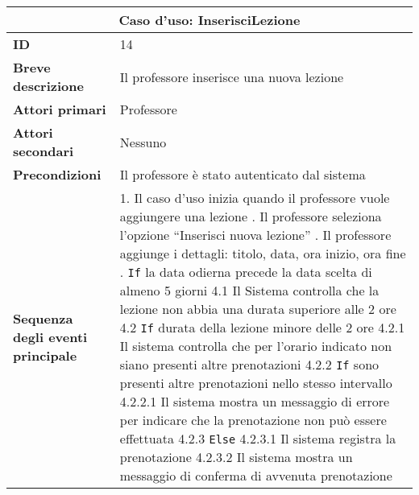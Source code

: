 \documentclass[11pt,a4paper]{report}
\begin{document}
\begin{table}[h!]
\centering
\renewcommand{\arraystretch}{1.3}
\begin{tabular}{|p{4.2cm}|p{10.2cm}|}
\hline
\multicolumn{2}{|c|}{\textbf{Caso d’uso: InserisciLezione}} \\ \hline
\textbf{ID} & 14 \\ \hline
\textbf{Breve descrizione} & Il professore inserisce una nuova lezione \\ \hline
\textbf{Attori primari} & Professore \\ \hline
\textbf{Attori secondari} & Nessuno \\ \hline
\textbf{Precondizioni} & Il professore è stato autenticato dal sistema \\ \hline
\textbf{Sequenza degli eventi principale} &
1. Il caso d’uso inizia quando il professore vuole aggiungere una lezione \newline
2. Il professore seleziona l’opzione “Inserisci nuova lezione” \newline
3. Il professore aggiunge i dettagli: titolo, data, ora inizio, ora fine \newline
4. \texttt{If} la data odierna precede la data scelta di almeno 5 giorni \newline
\hspace*{0.5cm} 4.1 Il Sistema controlla che la lezione non abbia una durata superiore alle 2 ore \newline
\hspace*{0.5cm} 4.2 \texttt{If} durata della lezione minore delle 2 ore \newline
\hspace*{1cm} 4.2.1 Il sistema controlla che per l’orario indicato non siano presenti altre prenotazioni \newline
\hspace*{1cm} 4.2.2 \texttt{If} sono presenti altre prenotazioni nello stesso intervallo \newline
\hspace*{1.5cm} 4.2.2.1 Il sistema mostra un messaggio di errore per indicare che la prenotazione non può essere effettuata \newline
\hspace*{1cm} 4.2.3 \texttt{Else} \newline
\hspace*{1.5cm} 4.2.3.1 Il sistema registra la prenotazione \newline
\hspace*{1.5cm} 4.2.3.2 Il sistema mostra un messaggio di conferma di avvenuta prenotazione \newline

\end{tabular}
\end{table}
\end{document}
